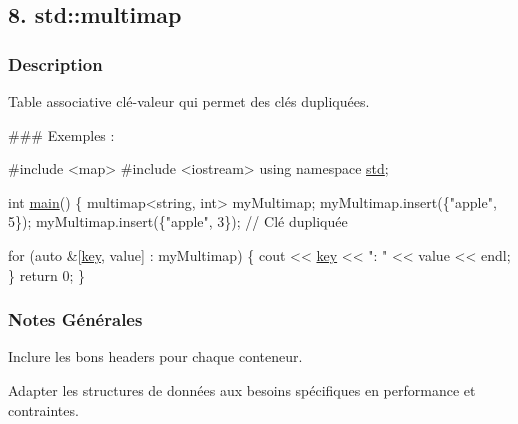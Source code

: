 \subsection*{8. std\+::multimap}

\subsubsection*{Description}

Table associative clé-\/valeur qui permet des clés dupliquées.

\#\#\# Exemples \+: 
\begin{DoxyCode}
\textcolor{preprocessor}{#include <map>}
\textcolor{preprocessor}{#include <iostream>}
\textcolor{keyword}{using namespace }\hyperlink{namespacestd}{std};

\textcolor{keywordtype}{int} \hyperlink{htop_8c_a3c04138a5bfe5d72780bb7e82a18e627}{main}() \{
    multimap<string, int> myMultimap;
    myMultimap.insert(\{\textcolor{stringliteral}{"apple"}, 5\});
    myMultimap.insert(\{\textcolor{stringliteral}{"apple"}, 3\}); \textcolor{comment}{// Clé dupliquée}

    \textcolor{keywordflow}{for} (\textcolor{keyword}{auto} &[\hyperlink{Action_8c_acd3d88da3c0e0313c3645ff34f62f542}{key}, value] : myMultimap) \{
        cout << \hyperlink{Action_8c_acd3d88da3c0e0313c3645ff34f62f542}{key} << \textcolor{stringliteral}{": "} << value << endl;
    \}
    \textcolor{keywordflow}{return} 0;
\}
\end{DoxyCode}




\subsubsection*{Notes Générales}


\begin{DoxyItemize}
\item Inclure les bons headers pour chaque conteneur.
\item Adapter les structures de données aux besoins spécifiques en performance et contraintes. 
\end{DoxyItemize}